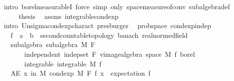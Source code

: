 \begin{isabellebody}
\ {\isacharparenleft}{\kern0pt}intro\ borel{\isacharunderscore}{\kern0pt}measurableI{\isacharcomma}{\kern0pt}\ force\ simp\ only{\isacharcolon}{\kern0pt}\ space{\isacharunderscore}{\kern0pt}measure{\isacharunderscore}{\kern0pt}of{\isacharunderscore}{\kern0pt}conv\ subalgebra{\isacharunderscore}{\kern0pt}def{\isacharparenright}{\kern0pt}\isanewline
\ \ \isamarkupfalse%
\isanewline
\ \ \isamarkupfalse%
\ \isamarkupfalse%
\ {\isacharquery}{\kern0pt}thesis\ \isamarkupfalse%
\ assms{\isacharparenleft}{\kern0pt}{}{\isacharparenright}{\kern0pt}\ integrable{\isacharunderscore}{\kern0pt}cond{\isacharunderscore}{\kern0pt}exp\ \isamarkupfalse%
\ {\isacharparenleft}{\kern0pt}intro\ Un{\isacharunderscore}{\kern0pt}sigma{\isachardot}{\kern0pt}cond{\isacharunderscore}{\kern0pt}exp{\isacharunderscore}{\kern0pt}charact{\isacharparenright}{\kern0pt}\ presburger{\isacharplus}{\kern0pt}\isanewline
{}\isamarkupfalse%
%
\endisatagproof
{\isafoldproof}%
%
\isadelimproof
\isanewline
%
\endisadelimproof
\isanewline
{}\isamarkupfalse%
\ {\isacharparenleft}{\kern0pt}\ prob{\isacharunderscore}{\kern0pt}space{\isacharparenright}{\kern0pt}\ cond{\isacharunderscore}{\kern0pt}exp{\isacharunderscore}{\kern0pt}indep{\isacharcolon}{\kern0pt}\isanewline
\ \ \ f\ {\isacharcolon}{\kern0pt}{\isacharcolon}{\kern0pt}\ {\isachardoublequoteopen}{\isacharprime}{\kern0pt}a\ {\isasymRightarrow}\ {\isacharprime}{\kern0pt}b\ {\isacharcolon}{\kern0pt}{\isacharcolon}{\kern0pt}\ {\isacharbraceleft}{\kern0pt}second{\isacharunderscore}{\kern0pt}countable{\isacharunderscore}{\kern0pt}topology{\isacharcomma}{\kern0pt}\ banach{\isacharcomma}{\kern0pt}\ real{\isacharunderscore}{\kern0pt}normed{\isacharunderscore}{\kern0pt}field{\isacharbraceright}{\kern0pt}{\isachardoublequoteclose}\isanewline
\ \ \ subalgebra{\isacharcolon}{\kern0pt}\ {\isachardoublequoteopen}subalgebra\ M\ F{\isachardoublequoteclose}\isanewline
\ \ \ \ \ \ \ independent{\isacharcolon}{\kern0pt}\ {\isachardoublequoteopen}indep{\isacharunderscore}{\kern0pt}set\ F\ {\isacharparenleft}{\kern0pt}vimage{\isacharunderscore}{\kern0pt}algebra\ {\isacharparenleft}{\kern0pt}space\ M{\isacharparenright}{\kern0pt}\ f\ borel{\isacharparenright}{\kern0pt}{\isachardoublequoteclose}\isanewline
\ \ \ \ \ \ \ integrable{\isacharcolon}{\kern0pt}\ {\isachardoublequoteopen}integrable\ M\ f{\isachardoublequoteclose}\isanewline
\ \ \ {\isachardoublequoteopen}AE\ x\ in\ M{\isachardot}{\kern0pt}\ cond{\isacharunderscore}{\kern0pt}exp\ M\ F\ f\ x\ {\isacharequal}{\kern0pt}\ expectation\ f{\isachardoublequoteclose}\isanewline

\end{isabellebody}

